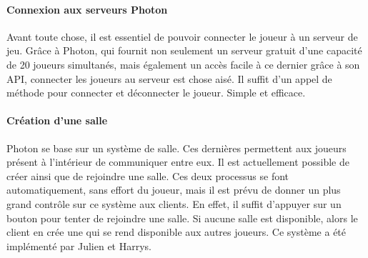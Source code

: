         \paragraph{Connexion aux serveurs Photon}
            Avant toute chose, il est essentiel de pouvoir connecter le joueur à un serveur de jeu.
            Grâce à Photon, qui fournit non seulement un serveur gratuit d'une capacité de 20 joueurs simultanés,
            mais également un accès facile à ce dernier grâce à son API, connecter les joueurs au serveur est chose
            aisé. Il suffit d'un appel de méthode pour connecter et déconnecter le joueur. Simple et efficace.

        \paragraph{Création d'une salle}
            Photon se base sur un système de salle. Ces dernières permettent aux joueurs présent à l'intérieur de communiquer entre eux.
            Il est actuellement possible de créer ainsi que de rejoindre une salle. Ces deux processus se font automatiquement, sans effort du joueur,
            mais il est prévu de donner un plus grand contrôle sur ce système aux clients.
            En effet, il suffit d'appuyer sur un bouton pour tenter de rejoindre une salle.
            Si aucune salle est disponible, alors le client en crée une qui se rend disponible aux autres joueurs.
            Ce système a été implémenté par Julien et Harrys.


